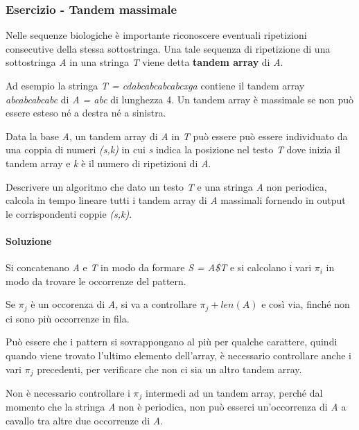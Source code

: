 \subsubsection{Esercizio - Tandem massimale}\label{esercizio---tandem-massimale}

Nelle sequenze biologiche è importante riconoscere eventuali ripetizioni consecutive della stessa sottostringa.
Una tale sequenza di ripetizione di una sottostringa \textit{A} in una stringa \textit{T} viene detta \textbf{tandem array} di \textit{A}.

Ad esempio la stringa \textit{T = cdabcabcabcabcxga} contiene  il tandem array \textit{abcabcabcabc} di \textit{A = abc} di lunghezza 4.
Un tandem array è massimale se non può essere esteso né a destra né a sinistra.

Data la base \textit{A}, un tandem array di \textit{A} in \textit{T} può essere può essere individuato da una coppia di numeri \textit{(s,k)} in cui \textit{s} indica la posizione nel testo \textit{T} dove inizia il tandem array e \textit{k} è il numero di ripetizioni di \textit{A}.

Descrivere un algoritmo che dato un testo \textit{T} e una stringa \textit{A} non periodica, calcola in tempo lineare tutti i tandem array di \textit{A} massimali fornendo in output le corrispondenti coppie \textit{(s,k)}.



\paragraph{Soluzione}\label{soluzione}

Si concatenano \emph{A} e \emph{T} in modo da formare \emph{S = A\$T} e si calcolano i vari $\pi_i$ in modo da trovare le occorrenze del
pattern.

Se $\pi_j$ è un occorenza di \emph{A}, si va a controllare
$\pi_j+len(A)$ e così via, finché non ci sono più occorrenze in
fila.

Può essere che i pattern si sovrappongano al più per qualche carattere,
quindi quando viene trovato l'ultimo elemento dell'array, è necessario
controllare anche i vari $\pi_j$ precedenti, per verificare che non ci sia un altro tandem array.

Non è necessario controllare i $\pi_j$ intermedi ad un tandem array,
perché dal momento che la stringa \emph{A} non è periodica, non può
esserci un'occorrenza di \emph{A} a cavallo tra altre due occorrenze di
\emph{A}.

